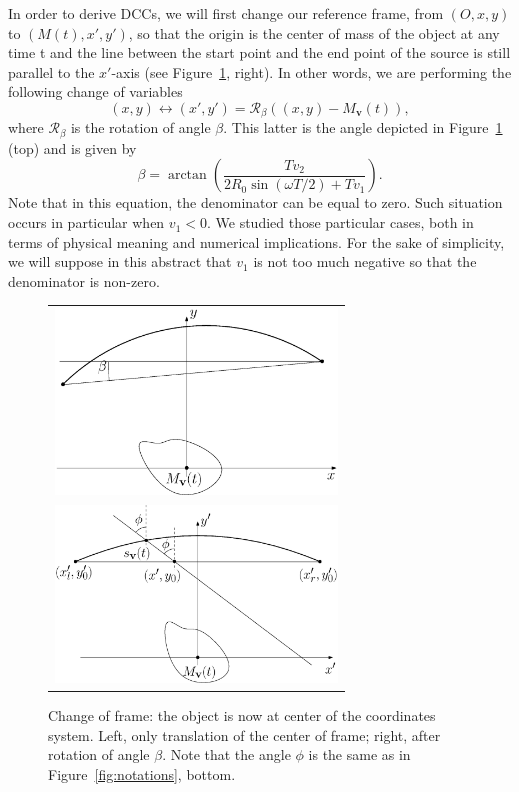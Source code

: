 \documentclass[twocolumn]{IEEEtran}
\numberwithin{equation}{section}
\newcommand{\Mbv}{M_{\mathbf{v}}}
\begin{document}
In order to derive DCCs, we will first change our reference frame, from $\left(O, x, y\right)$ to $\left(M(t), x', y'\right)$, so that the origin is the center of mass of the object at any time t and the line between the start point and the end point of the source is still parallel to the $x'$-axis (see Figure~\ref{fig:change_frame}, right). In other words, we are performing the following change of variables
\begin{equation}
	(x,y) \leftrightarrow (x',y') = \mathcal{R}_{\beta} \left( (x,y)-\Mbv(t) \right),
\end{equation}
where $\mathcal{R}_{\beta}$ is the rotation of angle $\beta$. This latter is the angle depicted in Figure~\ref{fig:change_frame} (top) and is given by
\begin{equation}
	\beta = \arctan \left( \frac{T v_2}{2R_0 \sin(\omega T/2) + T v_1} \right).
\end{equation}
Note that in this equation, the denominator can be equal to zero. Such situation occurs in particular when $v_1 < 0$. We studied those particular cases, both in terms of physical meaning and numerical implications. For the sake of simplicity, we will suppose in this abstract that $v_1$ is not too much negative so that the denominator is non-zero.

\begin{figure}[!ht]
	\centering
	\begin{tabular}{c}
	\includegraphics[width=75mm]{figs/frame_object_before_rotation.eps} \\
	\includegraphics[width=75mm]{figs/frame_object.eps}
	\end{tabular}
	\caption{Change of frame: the object is now at center of the coordinates system. Left, only translation of the center of frame; right, after rotation of angle $\beta$. Note that the angle $\phi$ is the same as in Figure~\ref{fig:notations}, bottom.\label{fig:change_frame}}
\end{figure}
\end{document}
